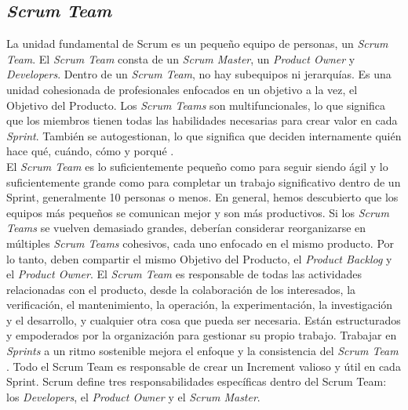 \begin{spacing}{1.5}
	\subsection{\textit{Scrum Team}}
		La unidad fundamental de Scrum es un pequeño equipo de personas, un \textit{Scrum Team}. El \textit{Scrum Team} consta de un \textit{Scrum Master}, un \textit{Product Owner} y \textit{Developers}. Dentro de un \textit{Scrum Team}, no hay subequipos ni jerarquías. Es una unidad cohesionada de profesionales enfocados en un objetivo a la vez, el Objetivo del Producto.
		Los \textit{Scrum Teams} son multifuncionales, lo que significa que los miembros tienen todas las habilidades
		necesarias para crear valor en cada \textit{Sprint}. También se autogestionan, lo que significa que deciden
		internamente quién hace qué, cuándo, cómo y porqu\'{e} \cite{chap2_scrum}.\\
		El \textit{Scrum Team} es lo suficientemente pequeño como para seguir siendo ágil y lo suficientemente grande
		como para completar un trabajo significativo dentro de un Sprint, generalmente 10 personas o menos.
		En general, hemos descubierto que los equipos más pequeños se comunican mejor y son más
		productivos. Si los \textit{Scrum Teams} se vuelven demasiado grandes, deberían considerar reorganizarse en
		múltiples \textit{Scrum Teams} cohesivos, cada uno enfocado en el mismo producto. Por lo tanto, deben
		compartir el mismo Objetivo del Producto, el \textit{Product Backlog} y el \textit{Product Owner}.
		El \textit{Scrum Team} es responsable de todas las actividades relacionadas con el producto, desde la
		colaboración de los interesados, la verificación, el mantenimiento, la operación, la experimentación, la
		investigación y el desarrollo, y cualquier otra cosa que pueda ser necesaria. Están estructurados y
		empoderados por la organización para gestionar su propio trabajo. Trabajar en \textit{Sprints} a un ritmo
		sostenible mejora el enfoque y la consistencia del \textit{Scrum Team} \cite{chap2_scrum}.
		Todo el Scrum Team es responsable de crear un Increment valioso y útil en cada Sprint. Scrum define
		tres responsabilidades específicas dentro del Scrum Team: los \textit{Developers}, el \textit{Product Owner} y el \textit{Scrum Master}.

\end{spacing}
